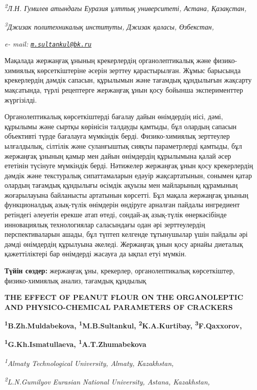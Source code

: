 {{{\emph{\textsuperscript{2}Л.Н. Гумилев атындағы Еуразия ұлттық
университеті, Астана, Қазақстан,}

\emph{\textsuperscript{3}Джизак политехникалық институты, Джизак қаласы,
Өзбекстан,}

\emph{e- mail:
\href{mailto:m.sultankul@bk.ru}{\nolinkurl{m.sultankul@bk.ru}}}

Мақалада жержаңғақ ұнының крекерлердің органолептикалық және
физико-химиялық көрсеткіштеріне әсерін зерттеу қарастырылған. Жұмыс
барысында крекерлердің дәмдік сапасын, құрылымын және тағамдық
құндылығын жақсарту мақсатында, түрлі рецептерге жержаңғақ ұнын қосу
бойынша эксперименттер жүргізілді.

Органолептикалық көрсеткіштерді бағалау дайын өнімдердің иісі, дәмі,
құрылымы және сыртқы көрінісін талдауды қамтыды, бұл олардың сапасын
объективті түрде бағалауға мүмкіндік берді. Физико-химиялық зерттеулер
ылғалдылық, сілтілік және суланғыштық сияқты параметрлерді қамтыды, бұл
жержаңғақ ұнының қамыр мен дайын өнімдердің құрылымына қалай әсер
ететінін түсінуге мүмкіндік берді. Нәтижелер жержаңғақ ұнын қосу
крекерлердің дәмдік және текстуралық сипаттамаларын едәуір
жақсартатынын, сонымен қатар олардың тағамдық құндылығы өсімдік ақуызы
мен майларының құрамының жоғарылауына байланысты артатынын көрсетті. Бұл
мақала жержаңғақ ұнының функционалдық азық-түлік өнімдерін өндіруге
арналған пайдалы ингредиент ретіндегі әлеуетін ерекше атап өтеді,
сондай-ақ азық-түлік өнеркәсібінде инновациялық технологиялар
саласындағы одан әрі зерттеулердің перспективаларын ашады, бұл түптеп
келгенде тұтынушылар үшін пайдалы әрі дәмді өнімдердің құрылуына
әкеледі. Жержаңғақ ұнын қосу арнайы диеталық қажеттіліктері бар
өнімдерді жасауға да ықпал етуі мүмкін.

{\bfseries Түйін сөздер:} жержаңғақ ұны, крекерлер, органолептикалық
көрсеткіштер, физико-химиялық анализ, тағамдық құндылық

{\bfseries THE EFFECT OF PEANUT FLOUR ON THE ORGANOLEPTIC AND
PHYSICO-CHEMICAL PARAMETERS OF CRACKERS}

{\bfseries \textsuperscript{1}B.Zh.Muldabekova,
\textsuperscript{1}M.B.Sultankul\textsuperscript{\envelope },
\textsuperscript{2}K.A.Kurtibay, \textsuperscript{3}F.Qaxxorov,}

{\bfseries \textsuperscript{1}G.Kh.Ismatullaeva,
\textsuperscript{1}A.T.Zhumabekova}

\emph{\textsuperscript{1}Almaty Technological University, Almaty,
Kazakhstan,}

\emph{\textsuperscript{2}L.N.Gumilyov Eurasian National University,
Astana, Kazakhstan,}

}}}
